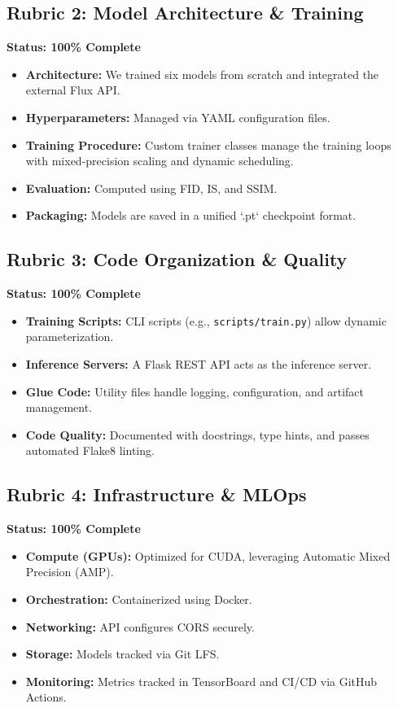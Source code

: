 \documentclass[12pt,a4paper]{article}
\begin{document}
\subsection{Rubric 2: Model Architecture \& Training}
\textbf{Status: 100\% Complete} \\
\begin{itemize}
    \item \textbf{Architecture:} We trained six models from scratch and integrated the external Flux API.
    \item \textbf{Hyperparameters:} Managed via YAML configuration files.
    \item \textbf{Training Procedure:} Custom trainer classes manage the training loops with mixed-precision scaling and dynamic scheduling.
    \item \textbf{Evaluation:} Computed using FID, IS, and SSIM.
    \item \textbf{Packaging:} Models are saved in a unified `.pt` checkpoint format.
\end{itemize}

\subsection{Rubric 3: Code Organization \& Quality}
\textbf{Status: 100\% Complete} \\
\begin{itemize}
    \item \textbf{Training Scripts:} CLI scripts (e.g., \texttt{scripts/train.py}) allow dynamic parameterization.
    \item \textbf{Inference Servers:} A Flask REST API acts as the inference server.
    \item \textbf{Glue Code:} Utility files handle logging, configuration, and artifact management.
    \item \textbf{Code Quality:} Documented with docstrings, type hints, and passes automated Flake8 linting.
\end{itemize}

\subsection{Rubric 4: Infrastructure \& MLOps}
\textbf{Status: 100\% Complete} \\
\begin{itemize}
    \item \textbf{Compute (GPUs):} Optimized for CUDA, leveraging Automatic Mixed Precision (AMP).
    \item \textbf{Orchestration:} Containerized using Docker.
    \item \textbf{Networking:} API configures CORS securely.
    \item \textbf{Storage:} Models tracked via Git LFS.
    \item \textbf{Monitoring:} Metrics tracked in TensorBoard and CI/CD via GitHub Actions.
\end{itemize}
\end{document}
